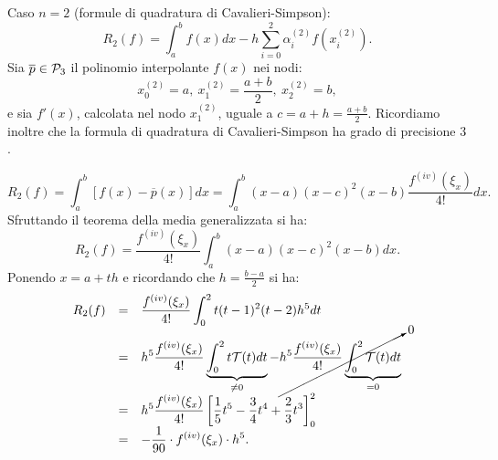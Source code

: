 \begin{dimo}Caso $n=2$ (formule di quadratura di Cavalieri-Simpson):
\[
R_2(f) = \int_a^bf(x)dx - h \sum_{i=0}^2\alpha_i^{(2)}f(x_i^{(2)}).
\]
Sia $\overline{p} \in \mathcal{P}_3$ il polinomio interpolante $f(x)$ nei nodi:
\[x_0^{(2)}=a, \ x_1^{(2)}= \frac{a+b}{2}, \  x_2^{(2)}=b,\]
e sia $f'(x)$, calcolata nel nodo $x_1^{(2)}$, uguale a $c = a + h = 
\frac{a+b}{2}$. Ricordiamo inoltre che la formula di quadratura di 
Cavalieri-Simpson ha grado di precisione $3$.

\[
R_2(f) = \int_a^b\left[f(x) - \overline{p}(x)\right]dx =
\int_a^b(x-a)(x-c)^2(x-b) \frac{f^{(iv)}(\xi_x)}{4!}dx.
\]
Sfruttando il teorema della media generalizzata si ha:
\[R_2(f) =
\frac{f^{(iv)}(\xi_x)}{4!}  \int_a^b(x-a)(x-c)^2(x-b)dx.
\]
Ponendo $x = a + th$ e ricordando che $h = \frac{b-a}{2}$ si ha:
\[\begin{array}{lcl}\displaystyle
R_2(f) & = &\displaystyle \frac{f^{(iv)}(\xi_x)}{4!} \int_0^2t(t-1)^2(t-2)h^5dt \\
& = &\displaystyle h^5 \frac{f^{(iv)}(\xi_x)}{4!}
\underbrace{\int_0^2t\mathcal{T}(t)dt}_{\neq 0} - \cancelto{0}{
h^5 \frac{f^{(iv)}(\xi_x)}{4!}\underbrace{\int_0^2\mathcal{T}(t)dt}_{=0}}\\
& = &\displaystyle h^5\frac{f^{(iv)}(\xi_x)}{4!}\left[\frac{1}{5}t^5-
\frac{3}{4}t^4+\frac{2}{3}t^3\right]_0^2 \\
& = &\displaystyle -\frac{1}{90}\cdot f^{(iv)}(\xi_x)\cdot h^5.
\end{array}\]
\end{dimo}

